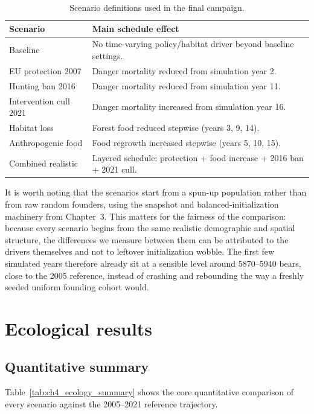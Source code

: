 \begin{table}[htbp]
\centering
\caption{Scenario definitions used in the final campaign.}
\label{tab:ch4_scenario_matrix}
\begin{tabular}{|l|p{8.5cm}|}
\hline
Scenario & Main schedule effect \\
\hline
Baseline & No time-varying policy/habitat driver beyond baseline settings. \\
EU protection 2007 & Danger mortality reduced from simulation year 2. \\
Hunting ban 2016 & Danger mortality reduced from simulation year 11. \\
Intervention cull 2021 & Danger mortality increased from simulation year 16. \\
Habitat loss & Forest food reduced stepwise (years 3, 9, 14). \\
Anthropogenic food & Food regrowth increased stepwise (years 5, 10, 15). \\
Combined realistic & Layered schedule: protection + food increase + 2016 ban + 2021 cull. \\
\hline
\end{tabular}
\end{table}

It is worth noting that the scenarios start from a spun-up population rather than from raw random founders, using the snapshot and balanced-initialization machinery from Chapter~3. This matters for the fairness of the comparison: because every scenario begins from the same realistic demographic and spatial structure, the differences we measure between them can be attributed to the drivers themselves and not to leftover initialization wobble. The first few simulated years therefore already sit at a sensible level around 5870--5940 bears, close to the 2005 reference, instead of crashing and rebounding the way a freshly seeded uniform founding cohort would.

\section{Ecological results}

\subsection{Quantitative summary}

Table~\ref{tab:ch4_ecology_summary} shows the core quantitative comparison of every scenario against the 2005--2021 reference trajectory.


